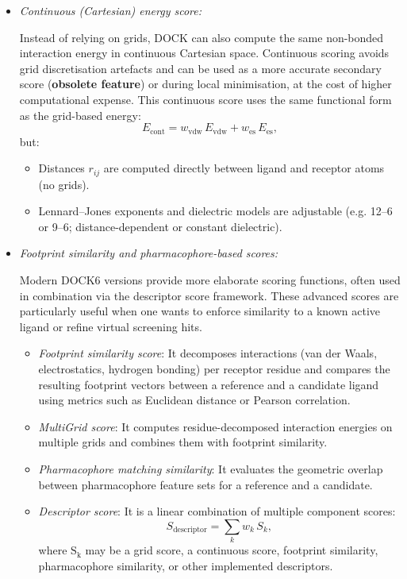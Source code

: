 \documentclass[12pt]{article}
\begin{document}
\begin{itemize}
\item \emph{Continuous (Cartesian) energy score:}

Instead of relying on grids, DOCK can also compute the same non-bonded interaction energy in continuous Cartesian space. Continuous scoring avoids grid discretisation artefacts and can be used as a more accurate secondary score (\textbf{obsolete feature}) or during local minimisation, at the cost of higher computational expense.
This continuous score uses the same functional form as the grid-based energy:
\begin{equation}
  E_{\text{cont}} =
    w_{\text{vdw}}\, E_{\text{vdw}} +
    w_{\text{es}}\, E_{\text{es}},
\end{equation}
but:
\begin{itemize}
  \item Distances $r_{ij}$ are computed directly between ligand and receptor atoms (no grids).
  \item Lennard--Jones exponents and dielectric models are adjustable (e.g. 12--6 or 9--6; distance-dependent or constant dielectric).
\end{itemize}


\item \emph{Footprint similarity and pharmacophore-based scores:}

Modern DOCK6 versions provide more elaborate scoring functions, often used in combination via the descriptor score framework\cite{CH7_Allen2015}. These advanced scores are particularly useful when one wants to enforce similarity to a known active ligand or refine virtual screening hits. 

\begin{itemize}
  \item \emph{Footprint similarity score}: It decomposes interactions (van der Waals, electrostatics, hydrogen bonding) per receptor residue and compares the resulting footprint vectors between a reference and a candidate ligand using metrics such as Euclidean distance or Pearson correlation.
  \item \emph{MultiGrid score}: It computes residue-decomposed interaction energies on multiple grids and combines them with footprint similarity.
  \item \emph{Pharmacophore matching similarity}: It evaluates the geometric overlap between pharmacophore feature sets for a reference and a candidate.
  \item \emph{Descriptor score}: It is a linear combination of multiple component scores:
        \begin{equation}
          S_{\text{descriptor}} =
            \sum_k w_k\, S_k,
        \end{equation}
        where $\textrm{S}_\textrm{k}$ may be a grid score, a continuous score, footprint similarity, pharmacophore similarity, or other implemented
        descriptors.
\end{itemize}
\end{itemize}
\end{document}

